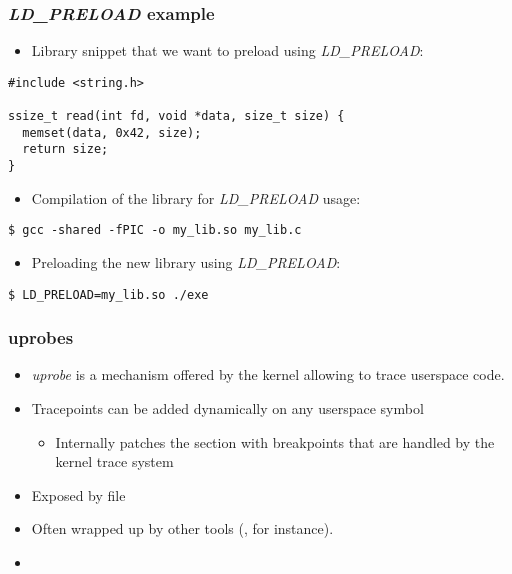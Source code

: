 \begin{frame}[fragile]
  \frametitle{{\em LD\_PRELOAD} example}
  \begin{itemize}
    \item Library snippet that we want to preload using {\em LD\_PRELOAD}:
  \end{itemize}
  \begin{block}{}
    \begin{verbatim}
#include <string.h>

ssize_t read(int fd, void *data, size_t size) {
  memset(data, 0x42, size);
  return size;
}
    \end{verbatim}
  \end{block}
  \begin{itemize}
    \item Compilation of the library for {\em LD\_PRELOAD} usage:
  \end{itemize}
  \begin{block}{}
    \begin{verbatim}
$ gcc -shared -fPIC -o my_lib.so my_lib.c
    \end{verbatim}
  \end{block}

  \begin{itemize}
    \item Preloading the new library using {\em LD\_PRELOAD}:
  \end{itemize}
  \begin{block}{}
    \begin{verbatim}
$ LD_PRELOAD=my_lib.so ./exe
    \end{verbatim}
  \end{block}
\end{frame}

\begin{frame}[fragile]
  \frametitle{uprobes}
  \begin{itemize}
    \item {\em uprobe} is a mechanism offered by the kernel allowing to trace
          userspace code.
    \item Tracepoints can be added dynamically on any userspace symbol
    \begin{itemize}
      \item Internally patches the  section with breakpoints
        that are handled by the kernel trace system
    \end{itemize}
    \item Exposed by file 
    \item Often wrapped up by other tools (,  for
          instance).
    \item {}
  \end{itemize}
\end{frame}

